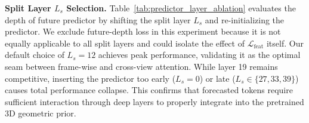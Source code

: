 \documentclass{llmxive}
\begin{document}
\begin{table}[t]
\begin{minipage}[t]{0.41\linewidth}
\label{tab:predictor_layer_ablation}
\vspace{-0.65em}
{%
\setlength{\tabcolsep}{2.7pt}%
}

\vspace{-0.25em} %

\label{tab:inference_time}
\vspace{0.15em}
\end{minipage}

\vspace{-1em} %

\end{table}



\noindent\textbf{Split Layer $L_s$ Selection.}
Table~\ref{tab:predictor_layer_ablation} evaluates the depth of future predictor by shifting the split layer $L_s$ and re-initializing the predictor. We exclude future-depth loss in this experiment because it is not equally applicable to all split layers and could isolate the effect of $\mathcal{L}_{\text{feat}}$ itself. Our default choice of $L_s=12$ achieves peak performance, validating it as the optimal seam between frame-wise and cross-view attention. While layer 19 remains competitive, inserting the predictor too early ($L_s=0$) or late ($L_s\in\{27,33,39\}$) causes total performance collapse. This confirms that forecasted tokens require sufficient interaction through deep layers to properly integrate into the pretrained 3D geometric prior.
\end{document}
